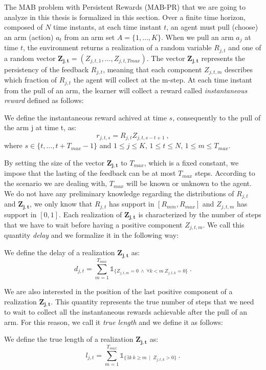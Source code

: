 The MAB problem with Persistent Rewards (MAB-PR) that we are going to analyze in this thesis is formalized in this section. Over a finite time horizon, composed of $N$ time instants, at each time instant $t$, an agent must pull (choose) an arm (action) $a_t$ from an arm set $A =\{1, \dots, K\} $. When we pull an arm $a_j$ at time $t$, the environment returns a realization of a random variable $R_{j,t}$ and one of a random vector $\boldsymbol{Z_{j,t}}= (Z_{j,t,1},\dots, Z_{j,t,Tmax})$. The vector $\boldsymbol{Z_{j,t}}$ represents the persistency of the feedback $R_{j,t}$, meaning that each component $Z_{j,t,m}$ describes which fraction of $R_{j,t}$ the agent will collect at the m-step. At each time instant from the pull of an arm, the learner will collect a reward called \emph{instantaneous reward} defined as follows:
\begin{definition}
	We define the instantaneous reward achived at time $s$, consequently to the pull of the arm j at time t, as:	
		$$r_{j,t,s} = R_{j,t} Z_{j,t,s-t+1} \ ,$$
where $s \in \{t,\dots,t+T_{max}-1\}$ and $1\leq j \leq K$, $1\leq t \leq N$, $1\leq m \leq T_{max}$.
\end{definition}
By setting the size of the vector $\boldsymbol{Z_{j,t}}$ to $T_{max}$, which is a fixed constant, we impose that the lasting of the feedback can be at most $T_{max}$ steps. According to the scenario we are dealing with, $T_{max}$ will be known or unknown to the agent. We do not have any preliminary knowledge regarding the distributions of $R_{j,t}$ and $\boldsymbol{Z_{j,t}}$, we only know that $R_{j,t}$ has support in $[R_{min},R_{max}]$ and $Z_{j,t,m}$ has support in $[0,1]$. Each realization of $\boldsymbol{Z_{j,t}}$ is characterized by the number of steps that we have to wait before having a positive component $Z_{j,t,m}$. We call this quantity \emph{delay} and we formalize it in the following way:
\begin{definition}[Delay]
	We define the delay of a realization $\boldsymbol{Z_{j,t}}$ as:$$d_{j,t} = \sum_{m=1}^{T_{max}}\mathds{1}_{\{Z_{j,t,m}=0\ \wedge\ \forall k<m\ Z_{j,t,k} = 0\}}\ .$$

\end{definition}
We are also interested in the position of the last positive component of a realization $\boldsymbol{Z_{j,t}}$. This quantity represents the true number of steps that we need to wait to collect all the instantaneous rewards achievable after the pull of an arm. For this reason, we call it \emph{true length} and we define it as follows:
\begin{definition}
	We define the true length of a realization $\boldsymbol{Z_{j,t}}$ as:
		$$l_{j,t} = \sum_{m=1}^{T_{max}}\mathds{1}_{\{\exists k \ k\geq m \ \mid \ Z_{j,t,k} > 0\}} \ .$$
\end{definition}




